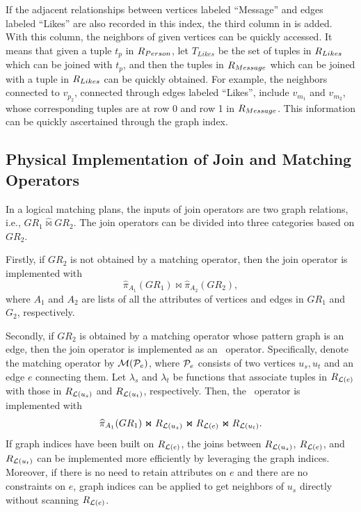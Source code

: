 If the adjacent relationships between vertices labeled ``Message'' and edges labeled ``Likes'' are also recorded in this index, the third column in  is added.
With this column, the neighbors of given vertices can be quickly accessed.
It means that given a tuple $t_p$ in ${R_{Person}}$, let $T_{Likes}$ be the set of tuples in ${R_{Likes}}$ which can be joined with $t_p$, and then the tuples in ${R_{Message}}$ which can be joined with a tuple in ${R_{Likes}}$ can be quickly obtained.
For example, the neighbors connected to $v_{p_2}$, connected through edges labeled ``Likes'', include $v_{m_1}$ and $v_{m_2}$, whose corresponding tuples are at row 0 and row 1 in ${R_{Message}}$.
This information can be quickly ascertained through the graph index.

\subsection{Physical Implementation of Join and Matching Operators}
\label{sec:join-matching-operator}
In a logical matching plans, the inputs of join operators are two graph relations, i.e., $GR_1 \widehat{\Join} GR_2$.
The join operators can be divided into three categories based on $GR_2$.

Firstly, if $GR_2$ is not obtained by a matching operator, then the join operator is implemented with 
\begin{equation*}
    \widehat{\pi}_{A_1}(GR_1) \Join \widehat{\pi}_{A_2}(GR_2),
\end{equation*}
where $A_1$ and $A_2$ are lists of all the attributes of vertices and edges in $GR_1$ and $G_2$, respectively.

Secondly, if $GR_2$ is obtained by a matching operator whose pattern graph is an edge, then the join operator is implemented as an \expandvertex~operator. 
Specifically, denote the matching operator by $\mathcal{M}(\mathcal{P}_e)$, where $\mathcal{P}_e$ consists of two vertices $u_s, u_t$ and an edge $e$ connecting them.
Let $\lambda_s$ and $\lambda_t$ be functions that associate tuples in ${R_{\mathcal{L}{(e)}}}$ with those in ${R_{\mathcal{L}(u_s)}}$ and ${R_{\mathcal{L}(u_t)}}$, respectively.
Then, the \expandvertex~operator is implemented with 
\begin{equation*}
    \widehat{\pi}_{A_1}(GR_1) \Join {\ensuremath R_{\mathcal{L}{(u_s)}}} \Join {\ensuremath R_{\mathcal{L}{(e)}}} \Join {\ensuremath R_{\mathcal{L}{(u_t)}}}.
\end{equation*}
If graph indices have been built on ${R_{\mathcal{L}(e)}}$, the joins between ${R_{\mathcal{L}(u_s)}}$, ${R_{\mathcal{L}(e)}}$, and ${R_{\mathcal{L}(u_t)}}$ can be implemented more efficiently by leveraging the graph indices.
Moreover, if there is no need to retain attributes on $e$ and there are no constraints on $e$, graph indices can be applied to get neighbors of $u_s$ directly without scanning ${R_{\mathcal{L}(e)}}$.

